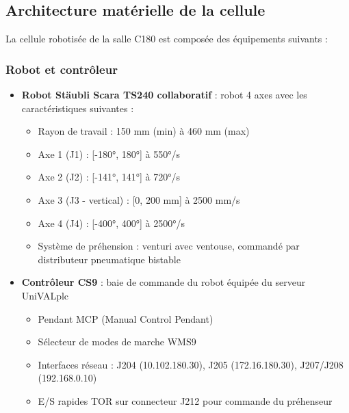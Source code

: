 \subsection{Architecture matérielle de la cellule}

La cellule robotisée de la salle C180 est composée des équipements suivants :

\subsubsection{Robot et contrôleur}
\begin{itemize}
    \item \textbf{Robot Stäubli Scara TS240 collaboratif} : robot 4 axes avec les caractéristiques suivantes :
    \begin{itemize}
        \item Rayon de travail : 150 mm (min) à 460 mm (max)
        \item Axe 1 (J1) : [-180°, 180°] à 550°/s
        \item Axe 2 (J2) : [-141°, 141°] à 720°/s
        \item Axe 3 (J3 - vertical) : [0, 200 mm] à 2500 mm/s
        \item Axe 4 (J4) : [-400°, 400°] à 2500°/s
        \item Système de préhension : venturi avec ventouse, commandé par distributeur pneumatique bistable
    \end{itemize}
    \item \textbf{Contrôleur CS9} : baie de commande du robot équipée du serveur UniVALplc
    \begin{itemize}
        \item Pendant MCP (Manual Control Pendant)
        \item Sélecteur de modes de marche WMS9
        \item Interfaces réseau : J204 (10.102.180.30), J205 (172.16.180.30), J207/J208 (192.168.0.10)
        \item E/S rapides TOR sur connecteur J212 pour commande du préhenseur
    \end{itemize}
\end{itemize}

